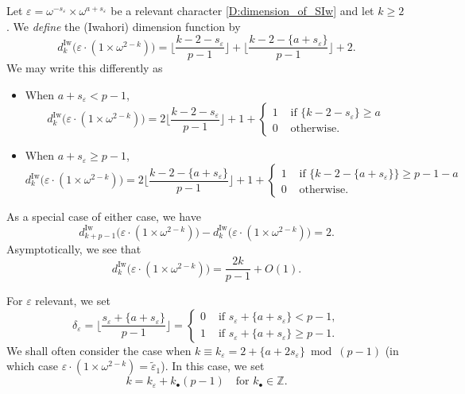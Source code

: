 \begin{definition}
    \label{D:dimension_of_SIw}
    Let $\varepsilon=\omega^{-s_\varepsilon}\times\omega^{a+s_\varepsilon}$ be a relevant character \ref{D:dimension_of_SIw} and let $k\ge2$.
    We \emph{define} the (Iwahori) dimension function by
    \begin{equation}
    \label{E:dimension_of_SIw}
    d_{k}^{\mathrm{Iw}}\big(\varepsilon\cdot (1\times \omega^{2-k})\big) = \Big\lfloor \frac{k-2-s_\varepsilon}{p-1}\Big\rfloor + \Big\lfloor \frac{k-2-\{a+s_\varepsilon\}}{p-1}\Big\rfloor +2.
    \end{equation}
    We may write this differently as
    \begin{itemize}
    \item When $a+s_\varepsilon<p-1$,
    $$
    d_{k}^{\mathrm{Iw}}\big(\varepsilon\cdot (1\times \omega^{2-k})\big) = 2\Big\lfloor \frac{k-2-s_\varepsilon}{p-1}\Big\rfloor +1+ \begin{cases}
    1 & \textrm{ if } \{k-2-s_\varepsilon\} \geq a\\ 0 & \textrm{ otherwise.}
    \end{cases}
    $$
    \item When $a+s_\varepsilon\geq p-1$,
    $$
    d_{k}^{\mathrm{Iw}}\big(\varepsilon\cdot (1\times \omega^{2-k})\big) = 2\Big\lfloor \frac{k-2-\{a+s_\varepsilon\}}{p-1}\Big\rfloor +1+ \begin{cases}
    1 & \textrm{ if } \{k-2-\{a+s_\varepsilon\}\} \geq p-1-a\\ 0 & \textrm{ otherwise.}
    \end{cases}
    $$
    \end{itemize}
    As a special case of either case, we have
    \[
    d_{k+p-1}^{\mathrm{Iw}}\big(\varepsilon\cdot (1\times \omega^{2-k})\big) - d_{k}^{\mathrm{Iw}}\big(\varepsilon\cdot (1\times \omega^{2-k})\big) = 2.
    \]
    Asymptotically, we see that $$d_k^{\mathrm{Iw}}\big(\varepsilon\cdot(1 \times \omega^{2-k})\big) = \frac{2k}{p-1} + O(1).$$
\end{definition}

\begin{notation}
    \label{N:kbullet}
    For $\varepsilon$ relevant, we set
    $$
    \delta_\varepsilon = \Big\lfloor \frac{s_\varepsilon + \{a+s_\varepsilon\}}{p-1}\Big \rfloor = \begin{cases}
    0 & \textrm{ if }s_\varepsilon + \{a+s_\varepsilon\} < p-1,\\
    1 & \textrm{ if }s_\varepsilon + \{a+s_\varepsilon\} \geq p-1.
    \end{cases}
    $$
    We shall often consider the case when $k \equiv k_\varepsilon =2+ \{a+2s_\varepsilon \} \bmod{(p-1)}$ (in which case $\varepsilon\cdot (1\times \omega^{2-k}) = \tilde \varepsilon_1$). In this case, we set $$k = k_\varepsilon + k_\bullet(p-1) \quad \textrm{for }k_\bullet \in {\mathbb{Z}}.$$
\end{notation}

